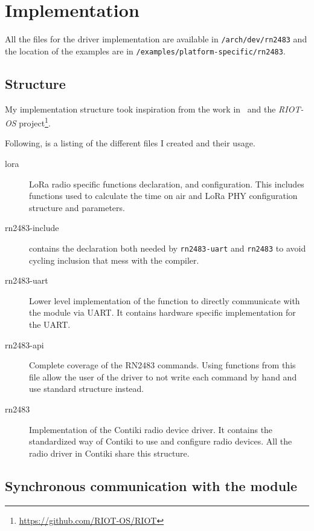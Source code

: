 \section{Implementation}

All the files for the driver implementation are available in
\lstinline{/arch/dev/rn2483} and the location of the examples are in
\lstinline{/examples/platform-specific/rn2483}.

\subsection{Structure}

My implementation structure took inspiration from the work 
in~\cite{8847137} and the \emph{RIOT-OS}
project\footnote{\url{https://github.com/RIOT-OS/RIOT}}. 

Following, is a listing of the different files I created and their
usage. %

\begin{description}
  \item[lora] LoRa radio specific functions declaration, and configuration. 
    This includes functions used to calculate the time on air and
    LoRa PHY configuration structure and parameters.
  \item[rn2483-include] contains the declaration both needed by
    \lstinline{rn2483-uart} and \lstinline{rn2483} to avoid cycling inclusion
    that mess with the compiler.
  \item[rn2483-uart] Lower level implementation of the function to directly
    communicate with the module via UART\@.
    It contains hardware specific implementation for the UART\@.
  \item[rn2483-api] Complete coverage of the RN2483 commands. Using functions
    from this file allow the user of the driver to not write
    each command by hand and use standard structure instead.
  \item[rn2483] Implementation of the Contiki radio device driver. 
    It contains the standardized way of Contiki to use and configure radio
    devices.
    All the radio driver in Contiki share this structure.
\end{description}

\subsection{Synchronous communication with the module}

